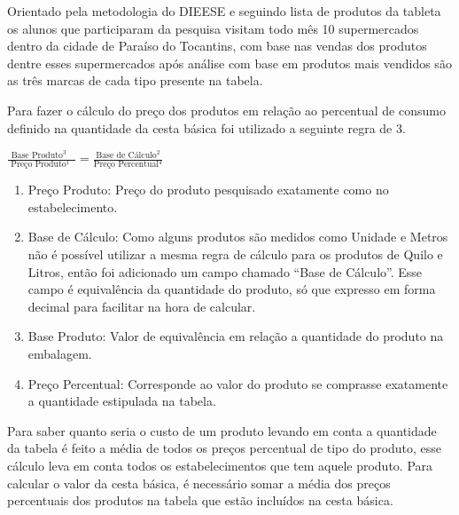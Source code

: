 \documentclass{ifto-tex}
\begin{document}
Orientado pela metodologia do DIEESE e seguindo lista de produtos da tableta os alunos que participaram da pesquisa visitam todo mês 10 supermercados dentro da cidade de Paraíso do Tocantins, com base nas vendas dos produtos dentre esses supermercados após análise com base em produtos mais vendidos são as três marcas de cada tipo presente na tabela.

Para fazer o cálculo do preço dos produtos em relação ao percentual de consumo definido na quantidade da cesta básica foi utilizado a seguinte regra de 3.

\begin{center}	
$\displaystyle\frac{\mbox {Base Produto$^{3}$ }}{\mbox { Preço Produto$^{1}$ }}=\frac{\mbox {Base de Cálculo$^{2}$} }{\mbox {Preço Percentual$^{4}$}}$
\end{center}
	
	\begin{enumerate}
	\item Preço Produto: Preço do produto pesquisado exatamente como no estabelecimento.
	\item Base de Cálculo: Como alguns produtos são medidos como Unidade e Metros não é possível utilizar a mesma regra de cálculo para os produtos de Quilo e Litros, então foi adicionado um campo chamado “Base de Cálculo”. Esse campo é equivalência da quantidade do produto, só que expresso em forma decimal para facilitar na hora de calcular.
	\item Base Produto: Valor de equivalência em relação a quantidade do produto na embalagem.
	\item Preço Percentual: Corresponde ao valor do produto se comprasse exatamente a quantidade estipulada na tabela.
	
\end{enumerate}

	Para saber quanto seria o custo de um produto levando em conta a quantidade da tabela é feito a média de todos os preços percentual de tipo do produto, esse cálculo leva em conta todos os estabelecimentos que tem aquele produto. Para calcular o valor da cesta básica, é necessário somar a média dos preços percentuais dos produtos na tabela que estão incluídos na cesta básica.
	
\end{document}

